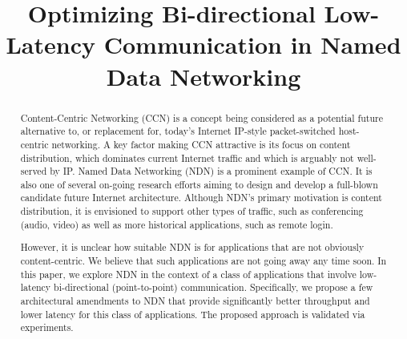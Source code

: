 \documentclass[conference]{IEEEtran}
\begin{document}
\title{Optimizing Bi-directional Low-Latency Communication in Named Data Networking}

\author{
}

\maketitle

\begin{abstract}
Content-Centric Networking (CCN) is a concept being considered as a potential
future alternative to, or replacement for, today's Internet IP-style packet-switched
host-centric networking. A key factor making CCN attractive is its focus on content distribution,
which dominates current Internet traffic and which is arguably not well-served by IP.
Named Data Networking (NDN) is a prominent example of CCN. It is also one of several
on-going research efforts aiming to design and develop a full-blown candidate future Internet
architecture. Although NDN's primary motivation is content distribution, it is envisioned to
support other types of traffic, such as conferencing (audio, video) as well as more historical
applications, such as remote login. 

However, it is unclear how suitable NDN is for applications that are not obviously
content-centric. We believe that such applications are not going away any time soon.
In this paper, we explore NDN in the context of a class of applications
that involve low-latency bi-directional (point-to-point) communication.
Specifically, we propose a few architectural amendments to NDN that provide 
significantly better throughput and lower latency for this class of applications.
The proposed approach is validated via experiments.
\end{abstract}
\end{document}
